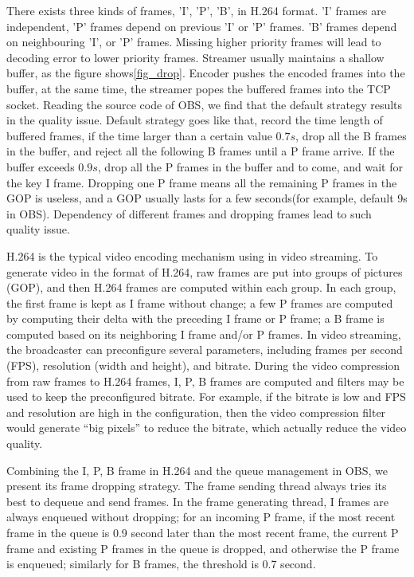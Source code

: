 There exists three kinds of frames, 'I', 'P', 'B', in H.264 format. 'I' frames are independent, 'P' frames depend on previous 'I' or 'P' frames. 'B' frames depend on neighbouring 'I', or 'P' frames. Missing higher priority frames will lead to decoding error to lower priority frames.
Streamer usually maintains a shallow buffer, as the figure shows\ref{fig_drop}. Encoder pushes the encoded frames into the buffer, at the same time, the streamer popes the buffered frames into the TCP socket. Reading the source code of OBS, we find that the default strategy results in the quality issue. Default strategy goes like that, record the time length of buffered frames, if the time larger than a certain value $0.7s$, drop all the B frames in the buffer, and reject all the following B frames until a P frame arrive. If the buffer exceeds $0.9s$, drop all the P frames in the buffer and to come, and wait for the key I frame. Dropping one P frame means all the remaining P frames in the GOP is useless, and a GOP usually lasts for a few seconds(for example, default 9s in OBS). Dependency of different frames and dropping frames lead to such quality issue.

H.264 is the typical video encoding mechanism using in video streaming. To generate video in the format of H.264, raw frames are put into groups of pictures (GOP), and then H.264 frames are computed within each group. In each group, the first frame is kept as I frame without change; a few P frames are computed by computing their delta with the preceding I frame or P frame; a B frame is computed based on its neighboring I frame and/or P frames. In video streaming, the broadcaster can preconfigure several parameters, including frames per second (FPS), resolution (width and height), and bitrate. During the video compression from raw frames to H.264 frames, I, P, B frames are computed and filters may be used to keep the preconfigured bitrate. For example, if the bitrate is low and FPS and resolution are high in the configuration, then the video compression filter would generate ``big pixels'' to reduce the bitrate, which actually reduce the video quality.

Combining the I, P, B frame in H.264 and the queue management in OBS, we present its frame dropping strategy. The frame sending thread always tries its best to dequeue and send frames. In the frame generating thread, I frames are always enqueued without dropping; for an incoming P frame, if the most recent frame in the queue is 0.9 second later than the most recent frame, the current P frame and existing P frames in the queue is dropped, and otherwise the P frame is enqueued; similarly for B frames, the threshold is 0.7 second.


